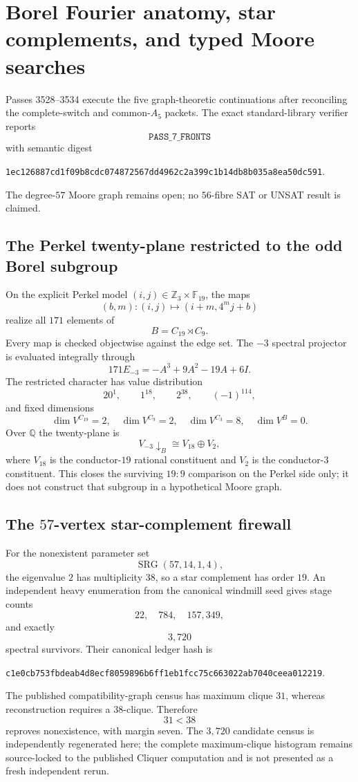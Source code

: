 \section{Borel Fourier anatomy, star complements, and typed Moore searches}
\label{sec:bt3528-3534-borel-star-moore}

Passes 3528--3534 execute the five graph-theoretic continuations after reconciling the complete-switch and common-$A_5$ packets.  The exact standard-library verifier reports
\[
\texttt{PASS\_7\_FRONTS}
\]
with semantic digest
\begin{center}
\texttt{1ec126887cd1f09b8cdc074872567dd4962c2a399c1b14db8b035a8ea50dc591}.
\end{center}
The degree-$57$ Moore graph remains open; no $56$-fibre SAT or UNSAT result is claimed.

\subsection{The Perkel twenty-plane restricted to the odd Borel subgroup}

On the explicit Perkel model $(i,j)\in\mathbb Z_3\times\mathbb F_{19}$, the maps
\[
(b,m):(i,j)\longmapsto(i+m,4^m j+b)
\]
realize all $171$ elements of
\[
B=C_{19}\rtimes C_9.
\]
Every map is checked objectwise against the edge set.  The $-3$ spectral projector is evaluated integrally through
\[
171E_{-3}=-A^3+9A^2-19A+6I.
\]
The restricted character has value distribution
\[
20^1,\qquad 1^{18},\qquad 2^{38},\qquad (-1)^{114},
\]
and fixed dimensions
\[
\dim V^{C_{19}}=2,
\quad
\dim V^{C_9}=2,
\quad
\dim V^{C_3}=8,
\quad
\dim V^B=0.
\]
Over $\mathbb Q$ the twenty-plane is
\[
\boxed{V_{-3}\downarrow_B\cong V_{18}\oplus V_2,}
\]
where $V_{18}$ is the conductor-$19$ rational constituent and $V_2$ is the conductor-$3$ constituent.  This closes the surviving $19{:}9$ comparison on the Perkel side only; it does not construct that subgroup in a hypothetical Moore graph.

\subsection{The $57$-vertex star-complement firewall}

For the nonexistent parameter set
\[
\operatorname{SRG}(57,14,1,4),
\]
the eigenvalue $2$ has multiplicity $38$, so a star complement has order $19$.  An independent heavy enumeration from the canonical windmill seed gives stage counts
\[
22,\quad 784,\quad 157{,}349,
\]
and exactly
\[
\boxed{3{,}720}
\]
spectral survivors.  Their canonical ledger hash is
\begin{center}
\texttt{c1e0cb753fbdeab4d8ecf8059896b6ff1eb1fcc75c663022ab7040ceea012219}.
\end{center}
The published compatibility-graph census has maximum clique $31$, whereas reconstruction requires a $38$-clique.  Therefore
\[
\boxed{31<38}
\]
reproves nonexistence, with margin seven.  The $3{,}720$ candidate census is independently regenerated here; the complete maximum-clique histogram remains source-locked to the published Cliquer computation and is not presented as a fresh independent rerun.

